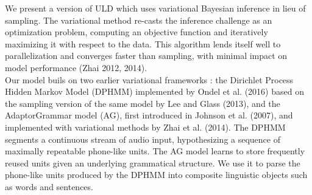 \documentclass[12pt,letterpaper]{article}
\newif\ifcomments
\newcommand{\cm}[1]{\textcolor{purple}{\ifcomments[COMMENT: #1]\else\fi}}
\begin{document}
We present a version of ULD which uses variational Bayesian inference in lieu of sampling. The variational method re-casts the inference challenge as an optimization problem, computing an objective function and iteratively maximizing it with respect to the data. This algorithm lends itself well to parallelization and converges faster than sampling, with minimal impact on model performance (Zhai 2012, 2014). \\

Our model buils on two earlier variational frameworks
: the Dirichlet Process Hidden Markov Model (DPHMM)\cm{I know lots of people do this---but don't introduce an abbreviation that you aren't going to use, there is no need for it. Also, in general, avoid abbreviations as much as possible. This is one of those things that people pick up as a feature of academic writing, but as Steve Pinker beat into me, it just makes it hard on the reader who has to remember what all of the abbreviations mean. Only use them when you are going to use them many many times and it is easy to remember.} implemented by Ondel et al. (2016) based on the sampling version of the same model by Lee and Glass (2013), and the AdaptorGrammar model (AG), first introduced in Johnson et al. (2007), and implemented with variational methods by Zhai et al. (2014).\cm{If you are going to introduce the names of the models that ULD builds on, they should be introduced when ULD is described. Here we are already talking about inference and we shouldn't be introducing new models and THEN new inference algorithms for those models. Here we should be saying that Ondel/Zhai introduce new inference algorithms for the model components introduced before. Also, probably best to cite the cohen paper as well as zhai, because that is the original locus classicus for VB AG.}  The DPHMM segments a continuous stream of audio input, hypothesizing a sequence of maximally repeatable phone-like units.
The AG model learns to store frequently reused units given an underlying grammatical structure. We use it to parse the phone-like units produced by the DPHMM into composite linguistic objects such as words and sentences. 
\end{document}
